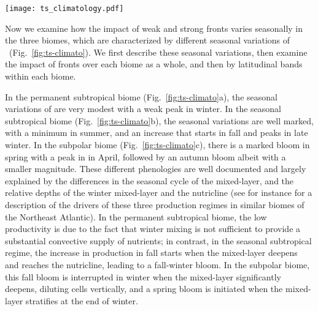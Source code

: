 \begin{figure*}
  \texttt{[image: ts\_climatology.pdf]}
  \caption{
    Seasonal impact of fronts on  in the permanent subtropical biome (1st column), in the seasonal subtropical biome (2nd column) and in the subpolar biome (3rd column).
    (a-b-c)~ median values (top row) over weak fronts (blue), strong fronts (green) and background (red).
    The differences between the curves show the local impact at the scale of fronts.
    (d-e-f)~Surface fraction occupied by weak fronts and strong fronts.
    (g-h-i)~Global  surplus due to weak fronts and strong fronts at the scale of the biome.
    The surplus accounts for the local excess and for the number of fronts (see method).
    The plain lines represent the climatological mean, and the envelopes mark the standard deviation over the period~2000--2020.
     is more strongly enhanced over strong fronts than over weak fronts, but weak fronts are more numerous than strong fronts, resulting in a  surplus that can be reversed.
  }%
  \label{fig:ts-climato}
\end{figure*}

Now we examine how the impact of weak and strong fronts varies seasonally in the three biomes, which are characterized by different seasonal variations of ~(Fig.~\ref{fig:ts-climato}).
We first describe these seasonal variations, then examine the impact of fronts over each biome as a whole, and then by latitudinal bands within each biome.

In the permanent subtropical biome (Fig.~\ref{fig:ts-climato}a), the seasonal variations of  are very modest with a weak peak in winter.
In the seasonal subtropical biome (Fig.~\ref{fig:ts-climato}b), the seasonal variations are well marked, with a minimum in summer, and an increase that starts in fall and peaks in late winter.
In the subpolar biome (Fig.~\ref{fig:ts-climato}c), there is a marked bloom in spring with a peak in  in April, followed by an autumn bloom albeit with a smaller magnitude.
These different phenologies are well documented and largely explained by the differences in the seasonal cycle of the mixed-layer, and the relative depths of the winter mixed-layer and the nutricline (see for instance \textcite{levy_2005a} for a description of the drivers of these three production regimes in similar biomes of the Northeast Atlantic).
In the permanent subtropical biome, the low productivity is due to the fact that winter mixing is not sufficient to provide a substantial convective supply of nutrients; in contrast, in the seasonal subtropical regime, the increase in production in fall starts when the mixed-layer deepens and reaches the nutricline, leading to a fall-winter bloom.
In the subpolar biome, this fall bloom is interrupted in winter when the mixed-layer significantly deepens, diluting cells vertically, and a spring bloom is initiated when the mixed-layer stratifies at the end of winter.

